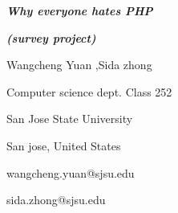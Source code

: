 \documentclass[12pt]{report}
\renewcommand{\_}{\kern-1.5pt\textunderscore\kern-1.5pt}
\begin{document}
\setlength{\parskip}{6.0pt}
\begin{Center}
{\fontsize{24pt}{28.8pt}\selectfont \textbf{\textit{Why everyone hates PHP}}}
\end{Center}
\begin{Center}
{\fontsize{14pt}{16.8pt}\selectfont \textbf{\textit{(survey project)}}}
\end{Center}

\vspace{\baselineskip}
\setlength{\parskip}{2.04pt}
\begin{Center}
Wangcheng Yuan ,Sida zhong
\end{Center}
\begin{Center}
{\fontsize{10pt}{12.0pt}\selectfont Computer science dept. Class 252}
\end{Center}
\begin{Center}
{\fontsize{10pt}{12.0pt}\selectfont San Jose State University}
\end{Center}
\begin{Center}
{\fontsize{10pt}{12.0pt}\selectfont San jose, United States}
\end{Center}

\vspace{\baselineskip}
\begin{Center}
{\fontsize{10pt}{12.0pt}\selectfont wangcheng.yuan@sjsu.edu}
\end{Center}
\begin{Center}
{\fontsize{10pt}{12.0pt}\selectfont sida.zhong@sjsu.edu}
\end{Center}
\begin{multicols}{2}

\vspace{\baselineskip}

\vspace{\baselineskip}

\vspace{\baselineskip}

\vspace{\baselineskip}

\end{multicols}

\vspace{\baselineskip}

\vspace{\baselineskip}
\end{document}
